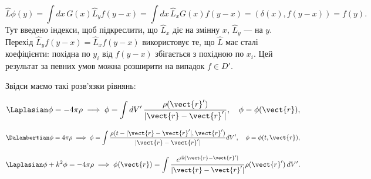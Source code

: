 \begin{equation*}
\hat{L}\phi(y) = \int dx \, G(x) \hat{L}_y f(y - x) = \int dx \, \hat{L}_x G(x) f(y - x) = (\delta(x), f(y - x)) = f(y).
\end{equation*}
Тут введено індекси, щоб підкреслити, що \( \hat{L}_x \) діє на змінну \( x \), \( \hat{L}_y \) --- на \( y \). Перехід \( \hat{L}_y f(y - x) = \hat{L}_x f(y - x) \) використовує те, що \( \hat{L} \) має сталі коефіцієнти: похідна по \( y_i \) від \( f(y-x) \) збігається з похідною по \( x_i \). Цей результат за певних умов можна розширити на випадок \( f \in D' \).

Звідси маємо такі розв'язки рівнянь:

\begin{equation}
\Laplasian \phi = -4\pi \rho \implies \phi = \int dV' \, \frac{\rho(\vect{r}')}{|\vect{r} - \vect{r}'|}, \quad \phi = \phi(\vect{r}),
\end{equation}

\begin{equation}
\Dalambertian \phi = 4\pi \rho \implies \phi = \int \frac{\rho(t - |\vect{r} - \vect{r}'|, \vect{r}')}{|\vect{r} - \vect{r}'|} dV' ,
\quad
\phi = \phi(t, \vect{r}),
\end{equation}

\begin{equation}
\Laplasian \phi + k^2 \phi = -4\pi \rho \implies \phi(\vect{r}) = \int \frac{e^{ik|\vect{r} - \vect{r}'|}}{|\vect{r} - \vect{r}'|}
\rho(\vect{r}')\,
dV'.
\end{equation}